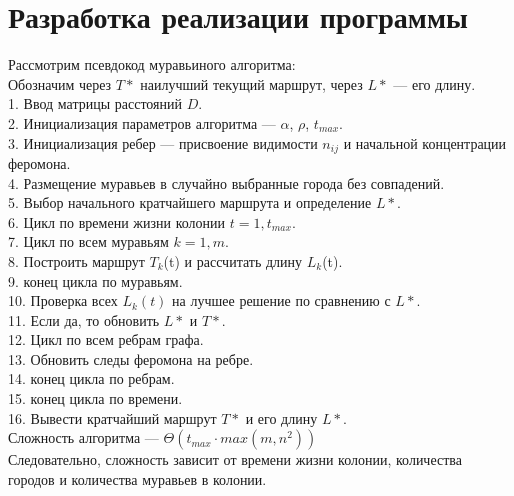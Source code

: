 \documentclass[12pt]{report}
\begin{document}
\section{Разработка реализации программы}

Рассмотрим псевдокод муравьиного алгоритма:\\

Обозначим через $T*$ наилучший текущий маршрут, через $L*$ — его длину. \\
1. Ввод матрицы расстояний $D$.\\
2. Инициализация параметров алгоритма — $\alpha$, $\rho$, $t_{max}$.\\
3. Инициализация ребер — присвоение видимости $n_{ij}$ и начальной концентрации феромона.\\
4. Размещение муравьев в случайно выбранные города без совпадений.\\
5. Выбор начального кратчайшего маршрута и определение $L*$.\\
6. Цикл по времени жизни колонии $t=1,t_{max}$. \\
\hspace*{6mm} 7. Цикл по всем муравьям $k=1,m$.\\
\hspace*{12mm}8. Построить маршрут $T_k$(t) и рассчитать длину $L_k$(t).\\
\hspace*{6mm}9. конец цикла по муравьям.\\
\hspace*{6mm}10. Проверка всех $ L_k(t)$ на лучшее решение по сравнению с $L*$. \\
\hspace*{6mm}11. Если да, то обновить $L*$ и $T*$.\\
\hspace*{6mm}12. Цикл по всем ребрам графа.\\
\hspace*{12mm}13. Обновить следы феромона на ребре.\\
\hspace*{6mm}14. конец цикла по ребрам.\\
15. конец цикла по времени.\\
16. Вывести кратчайший маршрут $T*$ и его длину $L*$.\\

Сложность алгоритма — $\Theta(t_{max}\cdot max(m,n^2))$ \\
Следовательно, сложность зависит от времени жизни колонии, количества городов и количества муравьев в колонии. \\
\end{document}
